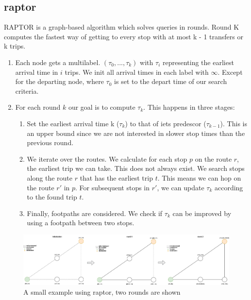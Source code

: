 \subsection{\acrfull{raptor}}
RAPTOR is a graph-based algorithm which solves queries in rounds. Round K computes the fastest way of getting to every stop with at most k - 1 transfers or k trips.

\begin{enumerate}
    \item Each node gets a multilabel. $(\tau_0,...,\tau_k)$ with $\tau_i$ representing the earliest arrival time in $i$ trips. We init all arrival times in each label with $\infty$. Except for the departing node, where $\tau_0$ is set to the depart time of our search criteria.
    \item For each round $k$ our goal is to compute $\tau_k$. This happens in three stages:\begin{enumerate}
        \item Set the earliest arrival time k ($\tau_k$) to that of iets predescor ($\tau_{k-1}$). This is an upper bound since we are not interested in slower stop times than the previous round.
        \item We iterate over the routes. We calculate for each stop $p$ on the route $r$, the earliest trip we can take. This does not always exist. We search stops along the route $r$ that has the earliest trip $t$. This means we can hop on the route $r'$ in $p$. For subsequent stops in $r'$, we can update $\tau_k$ according to the found trip $t$.
        \item Finally, footpaths are considered. We check if $\tau_k$ can be improved by using a footpath between two stops. 
    \end{enumerate}
\end{enumerate}

\begin{figure}[H]
    \centering
    \includegraphics[width=\textwidth]{images/rqptor.drawio.png}
    \caption{A small example using raptor, two rounds are shown }
    \label{fig:enter-label}
\end{figure}

